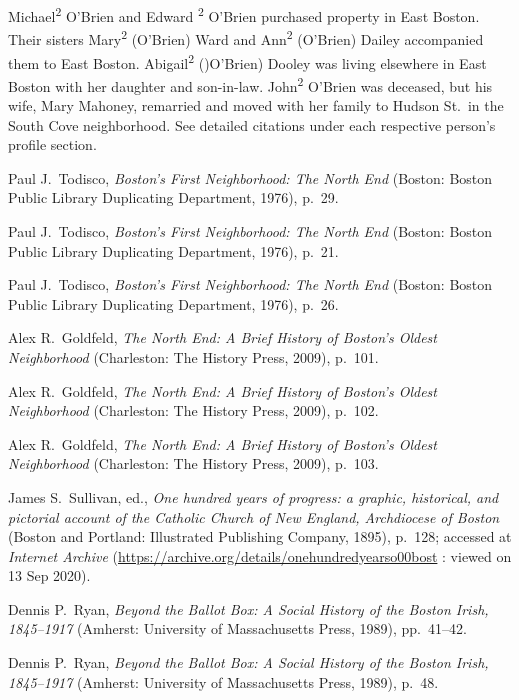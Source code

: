 \begin{thebibliography}{999}
	Michael\textsuperscript{2} O'Brien and Edward \textsuperscript{2} O'Brien purchased property in East Boston. Their sisters Mary\textsuperscript{2} (O'Brien) Ward and Ann\textsuperscript{2} (O'Brien) Dailey accompanied them to East Boston. Abigail\textsuperscript{2} ()O'Brien) Dooley was living elsewhere in East Boston with her daughter and son-in-law. John\textsuperscript{2} O'Brien was deceased, but his wife, Mary Mahoney, remarried and moved with her family to Hudson St.\ in the South Cove neighborhood. See detailed citations under each respective person's profile section.
	
	Paul J.\ Todisco, \textit{Boston's First Neighborhood: The North End} (Boston: Boston Public Library Duplicating Department, 1976), p.\ 29.
	
	Paul J.\ Todisco, \textit{Boston's First Neighborhood: The North End} (Boston: Boston Public Library Duplicating Department, 1976), p.\ 21.
	
	Paul J.\ Todisco, \textit{Boston's First Neighborhood: The North End} (Boston: Boston Public Library Duplicating Department, 1976), p.\ 26.
	
	Alex R.\ Goldfeld, \textit{The North End: A Brief History of Boston's Oldest Neighborhood} (Charleston: The History Press, 2009), p.\ 101.
	
	Alex R.\ Goldfeld, \textit{The North End: A Brief History of Boston's Oldest Neighborhood} (Charleston: The History Press, 2009), p.\ 102.
	
	Alex R.\ Goldfeld, \textit{The North End: A Brief History of Boston's Oldest Neighborhood} (Charleston: The History Press, 2009), p.\ 103.
	
	James S.\ Sullivan, ed., \textit{One hundred years of progress: a graphic, historical, and pictorial account of the Catholic Church of New England, Archdiocese of Boston} (Boston and Portland: Illustrated Publishing Company, 1895), p.\ 128; accessed at \textit{Internet Archive} (\url{https://archive.org/details/onehundredyearso00bost} : viewed on 13 Sep 2020).
	
	Dennis P.\ Ryan, \textit{Beyond the Ballot Box: A Social History of the Boston Irish, 1845--1917} (Amherst: University of Massachusetts Press, 1989), pp.\ 41--42.
	
	Dennis P.\ Ryan, \textit{Beyond the Ballot Box: A Social History of the Boston Irish, 1845--1917} (Amherst: University of Massachusetts Press, 1989), p.\ 48.
	

\end{thebibliography}
